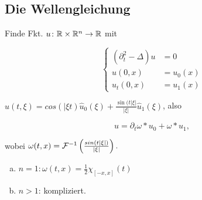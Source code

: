 \subsection{Die Wellengleichung}

Finde Fkt. $u \colon \mathbb{R} \times \mathbb{R}^n \to \mathbb{R}$ mit 

$$
\begin{cases} (\partial_t^2 - \Delta) u &= 0 \\ u(0,x) &= u_0(x) \\ u_t(0,x) &= u_1(x) \end{cases}
$$

$\hat  u(t,\xi) = cos(|\xi t) \hat u_0(\xi) + \frac{\sin(t |\xi|}{|\xi|} \hat u_1 (\xi)$, also

$$
u = \partial_t \omega \ast u_0 + \omega \ast u_1,
$$

wobei $\omega(t,x) = \mathcal{F}^{-1}\left(\frac{sin(t |\xi|)}{|\xi|}\right).$

\begin{enumerate}[a)]
  \item $n=1 \colon \omega(t,x) = \frac{1}{2} \chi_{[-x,x]}(t)$
  \item $n > 1$: kompliziert.
\end{enumerate}

